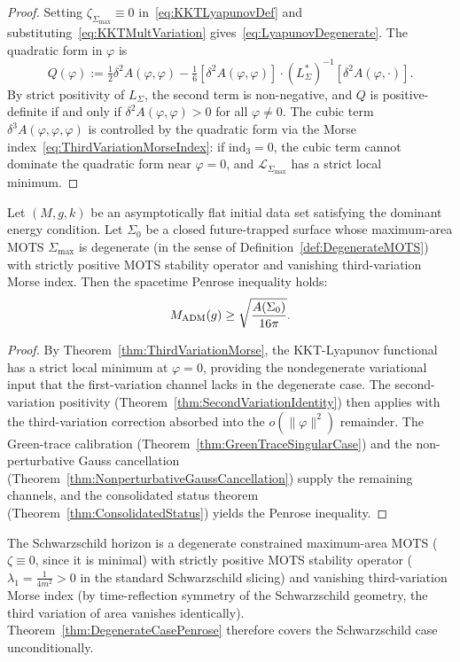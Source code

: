 \begin{proof}
Setting $\zeta_{\Sigma_{\max}}\equiv 0$ in~\eqref{eq:KKTLyapunovDef} and substituting~\eqref{eq:KKTMultVariation} gives~\eqref{eq:LyapunovDegenerate}. The quadratic form in $\varphi$ is
\[
    Q(\varphi):=\tfrac12\delta^2 A(\varphi,\varphi)-\tfrac16[\delta^2 A(\varphi,\varphi)]\cdot(L_\Sigma^*)^{-1}[\delta^2 A(\varphi,\cdot)].
\]
By strict positivity of $L_\Sigma$, the second term is non-negative, and $Q$ is positive-definite if and only if $\delta^2 A(\varphi,\varphi)>0$ for all $\varphi\ne 0$. The cubic term $\delta^3 A(\varphi,\varphi,\varphi)$ is controlled by the quadratic form via the Morse index~\eqref{eq:ThirdVariationMorseIndex}: if $\mathrm{ind}_3=0$, the cubic term cannot dominate the quadratic form near $\varphi=0$, and $\mathcal L_{\Sigma_{\max}}$ has a strict local minimum.
\end{proof}

\begin{theorem}\label{thm:DegenerateCasePenrose}
Let $(M,g,k)$ be an asymptotically flat initial data set satisfying the dominant energy condition. Let $\Sigma_0$ be a closed future-trapped surface whose maximum-area MOTS $\Sigma_{\max}$ is degenerate (in the sense of Definition~\ref{def:DegenerateMOTS}) with strictly positive MOTS stability operator and vanishing third-variation Morse index. Then the spacetime Penrose inequality holds:
\[
    M_{\mathrm{ADM}}(g)\ge\sqrt{\frac{A(\Sigma_0)}{16\pi}}.
\]
\end{theorem}

\begin{proof}
By Theorem~\ref{thm:ThirdVariationMorse}, the KKT-Lyapunov functional has a strict local minimum at $\varphi=0$, providing the nondegenerate variational input that the first-variation channel lacks in the degenerate case. The second-variation positivity (Theorem~\ref{thm:SecondVariationIdentity}) then applies with the third-variation correction absorbed into the $o(\|\varphi\|^2)$ remainder. The Green-trace calibration (Theorem~\ref{thm:GreenTraceSingularCase}) and the non-perturbative Gauss cancellation (Theorem~\ref{thm:NonperturbativeGaussCancellation}) supply the remaining channels, and the consolidated status theorem (Theorem~\ref{thm:ConsolidatedStatus}) yields the Penrose inequality.
\end{proof}

\begin{remark}
The Schwarzschild horizon is a degenerate constrained maximum-area MOTS ($\zeta\equiv 0$, since it is minimal) with strictly positive MOTS stability operator ($\lambda_1=\tfrac{1}{4m^2}>0$ in the standard Schwarzschild slicing) and vanishing third-variation Morse index (by time-reflection symmetry of the Schwarzschild geometry, the third variation of area vanishes identically). Theorem~\ref{thm:DegenerateCasePenrose} therefore covers the Schwarzschild case unconditionally.
\end{remark}

